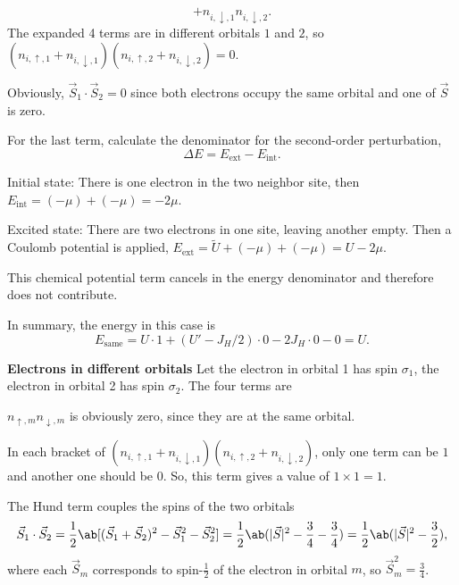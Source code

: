 \begin{solution}
\begin{enumext}
\begin{enumext}
\[      + n_{i,\downarrow,1}  n_{i,\downarrow,2}.
      \]
      The expanded 4 terms are in different orbitals $1$ and $2$,
      so $(n_{i,\uparrow,1} + n_{i,\downarrow,1})
          (n_{i,\uparrow,2} + n_{i,\downarrow,2}) = 0$.
      \item Obviously, $\vec S_1 \cdot \vec S_2 = 0$ since both electrons occupy
      the same orbital and one of $\vec S$ is zero.
      \item For the last term, calculate the denominator for the
      second-order perturbation,
      \[
        \Delta E = E_\text{ext} - E_\text{int}.
      \]
      \begin{enumext}[label = \arabic*.]
        \item Initial state: There is one electron in the two neighbor site,
        then $E_\text{int} = (-\mu) + (-\mu) = -2\mu$.
        \item Excited state: There are two electrons in one site, leaving
        another empty. Then a Coulomb potential is applied,
        $E_\text{ext} = \tilde U + (-\mu) + (-\mu) = U - 2\mu$.
      \end{enumext}
      This chemical potential term cancels in the energy denominator and
      therefore does not contribute.
    \end{enumext}
    In summary, the energy in this case is
    \[
      E_\text{same} = U \cdot 1 + (U' - J_H/2) \cdot 0 - 2J_H \cdot 0 - 0 = U.
    \]
    \item \textbf{Electrons in different orbitals}
    Let the electron in orbital 1 has spin $\sigma_1$, the electron in orbital
    2 has spin $\sigma_2$. The four terms are
    \begin{enumext}
      \item $n_{\uparrow,m} n_{\downarrow,m}$ is obviously zero, since they are
      at the same orbital.
      \item In each bracket of $(n_{i,\uparrow,1} + n_{i,\downarrow,1})
        (n_{i,\uparrow,2} + n_{i,\downarrow,2})$, only one term can be $1$
      and another one should be $0$. So, this term gives a value
      of $1 \times 1 = 1$.
      \item The Hund term couples the spins of the two orbitals
      \[
        \vec S_1 \cdot \vec S_2
      = \frac12\ab[(\vec S_1 + \vec S_2)^2 - \vec S_1^2 - \vec S_2^2]
      = \frac12\ab(|\vec S|^2 - \frac34 - \frac34)
      = \frac12\ab(|\vec S|^2 - \frac32),
      \]
      where each $\vec S_m$ corresponds to spin-$\frac12$ of the electron in
      orbital $m$, so $\vec S_m^2 = \frac34$.

\end{enumext}
\end{enumext}
\end{solution}
